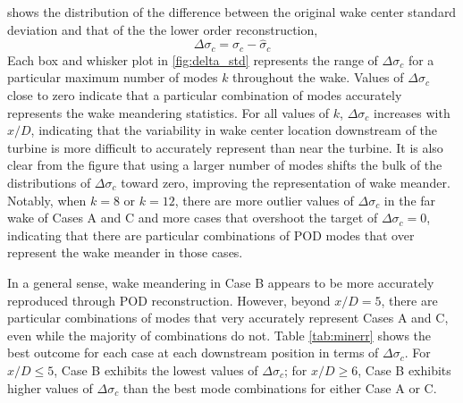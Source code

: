 \documentclass[aip,amsmath,amssymb,preprint,]{revtex4-1}
\begin{document}
 shows the distribution of the difference between the original wake center standard deviation and that of the the lower order reconstruction,
\begin{equation}
  \Delta \sigma_c = \sigma_c - \hat{\sigma}_c
  \label{eq:delta)std}
\end{equation}
Each box and whisker plot in \cref{fig:delta_std} represents the range of $\Delta \sigma_c$ for a particular maximum number of modes $k$ throughout the wake. 
Values of $\Delta \sigma_c$ close to zero indicate that a particular combination of modes accurately represents the wake meandering statistics.
For all values of $k$, $\Delta \sigma_c$ increases with $x/D$, indicating that the variability in wake center location downstream of the turbine is more difficult to accurately represent than near the turbine.
It is also clear from the figure that using a larger number of modes shifts the bulk of the distributions of $\Delta \sigma_c$ toward zero, improving the representation of wake meander.
Notably, when $k=8$ or $k=12$, there are more outlier values of $\Delta \sigma_c$ in the far wake of Cases A and C and more cases that overshoot the target of $\Delta \sigma_c=0$, indicating that there are particular combinations of POD modes that over represent the wake meander in those cases.

In a general sense, wake meandering in Case B appears to be more accurately reproduced through POD reconstruction.
However, beyond $x/D = 5$, there are  particular combinations of modes that very accurately represent Cases A and C, even while the majority of combinations do not.
Table \ref{tab:minerr} shows the best outcome for each case at each downstream position in terms of $\Delta \sigma_c$. 
For $x/D \le 5$, Case B exhibits the lowest values of $\Delta \sigma_c$; for $x/D \ge 6$, Case B exhibits higher values of $\Delta \sigma_c$ than the best mode combinations for either Case A or C.  
\end{document}
